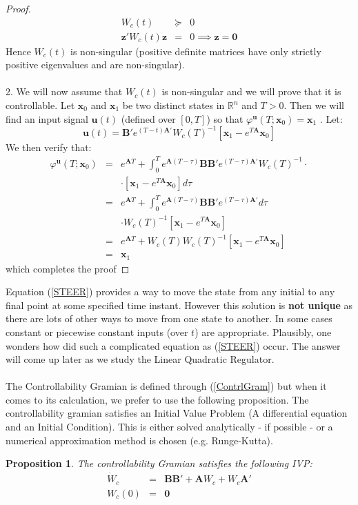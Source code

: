 \documentclass[a4paper,10pt,oneside]{book}
\newtheorem{proposition}[theorem]{Proposition}
\begin{document}
\begin{proof}
\begin{eqnarray}
 W_c(t) &\succeq& 0\\
 \mathbf{z}'W_c(t)\mathbf{z}&=&0 \implies \mathbf{z}=\mathbf{0}
\end{eqnarray}
Hence $W_c(t)$ is non-singular (positive definite matrices have only strictly positive eigenvalues and are non-singular).\\
\\
2. We will now assume that $W_c(t)$ is non-singular and we will prove that it is controllable. Let $\mathbf{x}_0$ and $\mathbf{x}_1$ be two distinct states in $\mathbb{R}^n$ and $T>0$. Then we will find an input signal $\mathbf{u}(t)$ (defined over $[0,T]$) so that $\varphi^{\mathbf{u}}(T;\mathbf{x}_0)=\mathbf{x}_1$ . Let:
\begin{equation}\label{STEER}
 \mathbf{u}(t)=\mathbf{B}'e^{(T-t)\mathbf{A}'}W_c(T)^{-1}\left[ \mathbf{x}_1-e^{T\mathbf{A}}\mathbf{x}_0\right]
\end{equation}
We then verify that:
\begin{eqnarray}
 \varphi^{\mathbf{u}}(T;\mathbf{x}_0) &=& e^{\mathbf{A}T} + \int_0^T e^{\mathbf{A}(T-\tau)}\mathbf{BB}'e^{(T-\tau)\mathbf{A}'}W_c(T)^{-1}\cdot\\ 
&& \cdot \left[ \mathbf{x}_1-e^{T\mathbf{A}}\mathbf{x}_0\right]d\tau\\
&=&e^{\mathbf{A}T} + \int_0^T e^{\mathbf{A}(T-\tau)}\mathbf{BB}'e^{(T-\tau)\mathbf{A}'}d\tau\\ 
&& \cdot W_c(T)^{-1}\left[ \mathbf{x}_1-e^{T\mathbf{A}}\mathbf{x}_0\right]\\
&=&e^{\mathbf{A}T} + W_c(T)W_c(T)^{-1}\left[ \mathbf{x}_1-e^{T\mathbf{A}}\mathbf{x}_0\right]\\
&=&  \mathbf{x}_1
\end{eqnarray}
which completes the proof
\end{proof}
\noindent Equation (\ref{STEER}) provides a way to move the state from any initial to any final point at some specified time instant. However this solution is \textbf{not unique} as there are lots of other ways to move from one state to another. In some cases constant or piecewise constant inputs (over $t$) are appropriate. Plausibly, one wonders how did such a complicated equation as (\ref{STEER}) occur. The answer will come up later as we study the Linear Quadratic Regulator.\\
\\
The Controllability Gramian is defined through (\ref{ContrlGram}) but when it comes to its calculation, we prefer to use the following proposition. The controllability gramian satisfies an Initial Value Problem (A differential equation and an Initial Condition). This is either solved analytically - if possible - or a numerical approximation method is chosen (e.g. Runge-Kutta).
\begin{proposition}
The controllability Gramian satisfies the following IVP:
\begin{eqnarray}
 \dot{W}_c &=& \mathbf{BB}'+\mathbf{A}W_c+W_c\mathbf{A}'\\
 W_c(0) &=& \mathbf{0}
\end{eqnarray}
\end{proposition}
\end{document}
